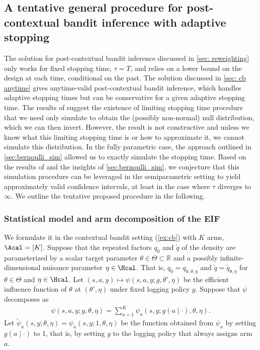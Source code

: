 \subsection{A tentative general procedure for post-contextual bandit inference with adaptive stopping}

The solution for post-contextual bandit inference discussed in \cref{sec: reweighting} only works for fixed stopping time, $\tau=T$, and relies on a lower bound on the design at each time, conditional on the past. The solution discussed in \cref{sec: cb anytime} gives anytime-valid post-contextual bandit inference, which handles adaptive stopping times but can be conservative for a given adaptive stopping time. The results of \cite{adusumilli2023optimal} suggest the existence of limiting stopping time procedure that we need only simulate to obtain the (possibly non-normal) null distribution, which we can then invert. However, the result is not constructive and unless we know what this limiting stopping time is or how to approximate it, we cannot simulate this distribution. In the fully parametric case, the approach outlined in \cref{sec:bernoulli_sim} allowed us to exactly simulate the stopping time. Based on the results of \cite{adusumilli2023optimal} and the insights of \cref{sec:bernoulli_sim}, we conjecture that this simulation procedure can be leveraged in the semiparametric setting to yield approximately valid confidence intervals, at least in the case where $\tau$ diverges to $\infty$. We outline the tentative proposed procedure in the following.



\subsubsection{Statistical model and arm decomposition of the EIF}
We formulate it in the contextual bandit setting (\cref{ex:cb}) with $K$ arms, $\Acal=[K]$. Suppose that the repeated factors $q_0$ and $\widetilde q$ of the density are parameterized by a scalar target parameter $\theta \in \Theta \subset \mathbb{R}$ and a possibly infinite-dimensional nuisance parameter $\eta \in \Hcal$. That is, $q_0 = q_{0, \theta, \eta}$ and $\widetilde q = \widetilde q_{\theta, \eta}$ for $\theta \in \Theta$ and $\eta \in \Hcal$. 
Let $(s, a, y) \mapsto \psi(s, a, y; g, \theta', \eta)$ be the efficient influence function of $\theta$ 
at $(\theta', \eta)$ under fixed logging policy $g$.
Suppose that $\psi$ decomposes as 
\begin{align}
    \psi(s, a, y; g, \theta, \eta) = \sum_{a = 1}^K  \psi_a(s, y; g(a \mid \cdot), \theta, \eta).
\end{align}
Let $\widetilde \psi_a(s, y; \theta, \eta) = \psi_a(s, y; 1, \theta, \eta)$ be the function obtained from $\psi_a$ by setting $g(a \mid \cdot)$ to 1, that is, by setting $g$ to the logging policy that always assigns arm $a$. 

